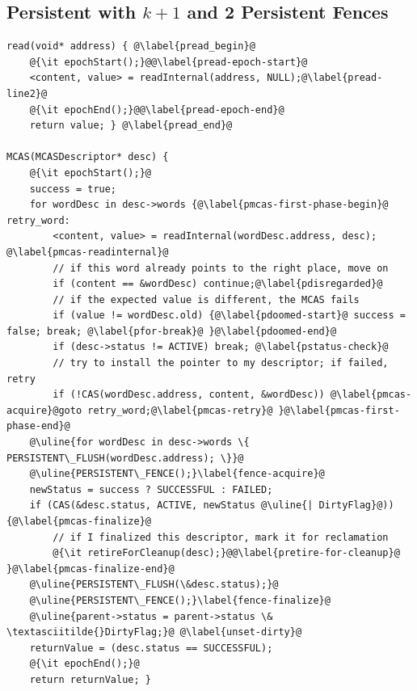 \subsection{Persistent \mcas{} with \texorpdfstring{$k+1$}{k+1} \cas{} and 2 Persistent Fences}\label{app:persistent-mcas}
\bigskip
\begin{lstlisting}[caption={[Our \mcas{} algorithm for persistent memory.]Our \mcas{} algorithm for persistent memory. Commands in {\it italic} are related to memory reclamation, and \uline{underlined} commands are related to persistence.},label=list:algo-persistent,firstnumber=1,keywords={}]
read(void* address) { @\label{pread_begin}@
    @{\it epochStart();}@@\label{pread-epoch-start}@
    <content, value> = readInternal(address, NULL);@\label{pread-line2}@
    @{\it epochEnd();}@@\label{pread-epoch-end}@
    return value; } @\label{pread_end}@

MCAS(MCASDescriptor* desc) {
    @{\it epochStart();}@
    success = true;
    for wordDesc in desc->words {@\label{pmcas-first-phase-begin}@
retry_word:
        <content, value> = readInternal(wordDesc.address, desc); @\label{pmcas-readinternal}@
        // if this word already points to the right place, move on
        if (content == &wordDesc) continue;@\label{pdisregarded}@
        // if the expected value is different, the MCAS fails
        if (value != wordDesc.old) {@\label{pdoomed-start}@ success = false; break; @\label{pfor-break}@ }@\label{pdoomed-end}@
        if (desc->status != ACTIVE) break; @\label{pstatus-check}@
        // try to install the pointer to my descriptor; if failed,    retry
        if (!CAS(wordDesc.address, content, &wordDesc)) @\label{pmcas-acquire}@goto retry_word;@\label{pmcas-retry}@ }@\label{pmcas-first-phase-end}@
    @\uline{for wordDesc in desc->words \{ PERSISTENT\_FLUSH(wordDesc.address); \}}@
    @\uline{PERSISTENT\_FENCE();}\label{fence-acquire}@
    newStatus = success ? SUCCESSFUL : FAILED;
    if (CAS(&desc.status, ACTIVE, newStatus @\uline{| DirtyFlag}@)){@\label{pmcas-finalize}@
        // if I finalized this descriptor, mark it for reclamation
        @{\it retireForCleanup(desc);}@@\label{pretire-for-cleanup}@ }@\label{pmcas-finalize-end}@
    @\uline{PERSISTENT\_FLUSH(\&desc.status);}@
    @\uline{PERSISTENT\_FENCE();}\label{fence-finalize}@
    @\uline{parent->status = parent->status \& \textasciitilde{}DirtyFlag;}@ @\label{unset-dirty}@
    returnValue = (desc.status == SUCCESSFUL);
    @{\it epochEnd();}@
    return returnValue; }
\end{lstlisting}
\newpage
